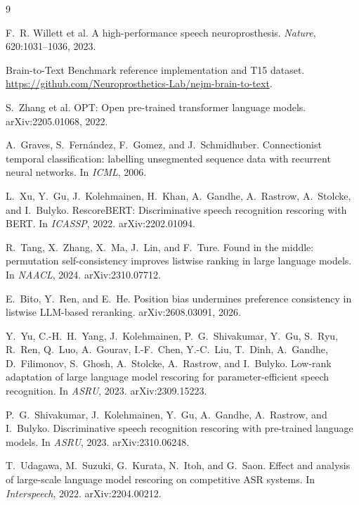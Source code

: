 \documentclass[11pt]{article}
\begin{document}
\begin{thebibliography}{9}\small

F.~R. Willett et al.
\newblock A high-performance speech neuroprosthesis.
\newblock \emph{Nature}, 620:1031--1036, 2023.

Brain-to-Text Benchmark reference implementation and T15 dataset.
\newblock \url{https://github.com/Neuroprosthetics-Lab/nejm-brain-to-text}.

S.~Zhang et al.
\newblock OPT: Open pre-trained transformer language models.
\newblock arXiv:2205.01068, 2022.

A.~Graves, S.~Fern\'andez, F.~Gomez, and J.~Schmidhuber.
\newblock Connectionist temporal classification: labelling unsegmented sequence data with
  recurrent neural networks.
\newblock In \emph{ICML}, 2006.

L.~Xu, Y.~Gu, J.~Kolehmainen, H.~Khan, A.~Gandhe, A.~Rastrow, A.~Stolcke, and I.~Bulyko.
\newblock RescoreBERT: Discriminative speech recognition rescoring with BERT.
\newblock In \emph{ICASSP}, 2022. arXiv:2202.01094.

R.~Tang, X.~Zhang, X.~Ma, J.~Lin, and F.~Ture.
\newblock Found in the middle: permutation self-consistency improves listwise ranking in
  large language models.
\newblock In \emph{NAACL}, 2024. arXiv:2310.07712.

E.~Bito, Y.~Ren, and E.~He.
\newblock Position bias undermines preference consistency in listwise LLM-based reranking.
\newblock arXiv:2608.03091, 2026.

Y.~Yu, C.-H.~H.~Yang, J.~Kolehmainen, P.~G.~Shivakumar, Y.~Gu, S.~Ryu, R.~Ren,
Q.~Luo, A.~Gourav, I.-F.~Chen, Y.-C.~Liu, T.~Dinh, A.~Gandhe, D.~Filimonov,
S.~Ghosh, A.~Stolcke, A.~Rastrow, and I.~Bulyko.
\newblock Low-rank adaptation of large language model rescoring for
  parameter-efficient speech recognition.
\newblock In \emph{ASRU}, 2023. arXiv:2309.15223.

P.~G.~Shivakumar, J.~Kolehmainen, Y.~Gu, A.~Gandhe, A.~Rastrow, and I.~Bulyko.
\newblock Discriminative speech recognition rescoring with pre-trained language
  models.
\newblock In \emph{ASRU}, 2023. arXiv:2310.06248.

T.~Udagawa, M.~Suzuki, G.~Kurata, N.~Itoh, and G.~Saon.
\newblock Effect and analysis of large-scale language model rescoring on competitive ASR
  systems.
\newblock In \emph{Interspeech}, 2022. arXiv:2204.00212.


\end{thebibliography}
\end{document}
